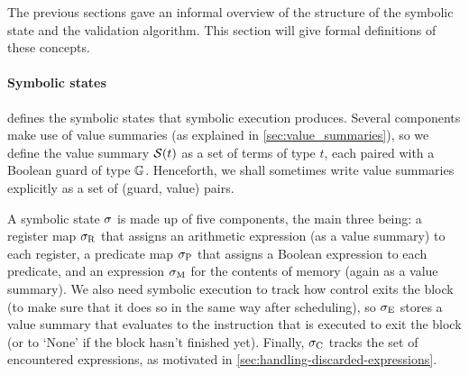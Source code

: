 {The previous sections gave an informal overview of the structure of the symbolic
state and the validation algorithm.  This section will give formal definitions
of these concepts.

\paragraph{Symbolic states}
 defines the symbolic states that symbolic execution produces. Several components make use of value summaries (as explained in \cref{sec:value_summaries}), so we define the value summary $\mathcal{S}(t)$ as a set
of terms of type $t$, each paired with a Boolean guard of type $\mathbb{G}$. Henceforth, we shall sometimes write value summaries explicitly as a set of (guard, value) pairs.

A symbolic state $\sigma$ is made up of five components, the main three
being: a register map $\sigma_{\mathrm{R}}$ that assigns an arithmetic
expression (as a value summary) to each register, a predicate map
$\sigma_{\mathrm{P}}$ that assigns a Boolean expression to each
predicate, and an expression $\sigma_{\mathrm{M}}$ for the contents of memory
(again as a value summary).  We also need symbolic execution to
track how control exits the block (to make sure that it does so in the
same way after scheduling), so $\sigma_{\mathrm{E}}$ stores a value summary that evaluates to the instruction that is executed to exit the block (or to `None' if the block hasn't finished yet). Finally, $\sigma_{\mathrm{C}}$ tracks the set of encountered expressions, as motivated in \cref{sec:handling-discarded-expressions}.



}
